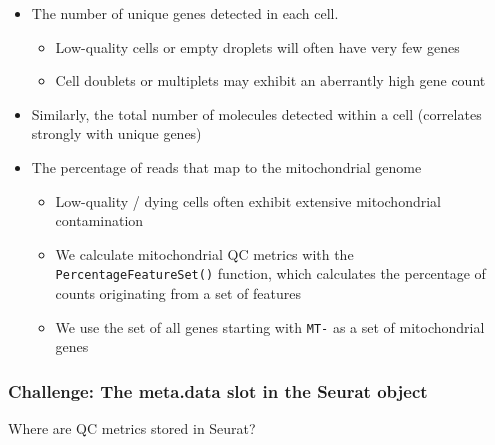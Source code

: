 \documentclass[
]{book}
\newenvironment{Shaded}{\begin{snugshade}}{\end{snugshade}}
\newcommand{\AttributeTok}[1]{\textcolor[rgb]{0.13,0.29,0.53}{#1}}
\newcommand{\CommentTok}[1]{\textcolor[rgb]{0.56,0.35,0.01}{\textit{#1}}}
\newcommand{\FunctionTok}[1]{\textcolor[rgb]{0.13,0.29,0.53}{\textbf{#1}}}
\newcommand{\NormalTok}[1]{#1}
\newcommand{\OtherTok}[1]{\textcolor[rgb]{0.56,0.35,0.01}{#1}}
\newcommand{\SpecialCharTok}[1]{\textcolor[rgb]{0.81,0.36,0.00}{\textbf{#1}}}
\newcommand{\StringTok}[1]{\textcolor[rgb]{0.31,0.60,0.02}{#1}}
\providecommand{\tightlist}{%
  \setlength{\itemsep}{0pt}\setlength{\parskip}{0pt}}
\begin{document}
\begin{itemize}
\tightlist
\item
  The number of unique genes detected in each cell.

  \begin{itemize}
  \tightlist
  \item
    Low-quality cells or empty droplets will often have very few genes
  \item
    Cell doublets or multiplets may exhibit an aberrantly high gene count
  \end{itemize}
\item
  Similarly, the total number of molecules detected within a cell (correlates strongly with unique genes)
\item
  The percentage of reads that map to the mitochondrial genome

  \begin{itemize}
  \tightlist
  \item
    Low-quality / dying cells often exhibit extensive mitochondrial contamination
  \item
    We calculate mitochondrial QC metrics with the \texttt{PercentageFeatureSet()} function, which calculates the percentage of counts originating from a set of features
  \item
    We use the set of all genes starting with \texttt{MT-} as a set of mitochondrial genes
  \end{itemize}
\end{itemize}

\begin{Shaded}
\end{Shaded}

\subsubsection*{Challenge: The meta.data slot in the Seurat object}\label{challenge-the-meta.data-slot-in-the-seurat-object}

Where are QC metrics stored in Seurat?
\end{document}

